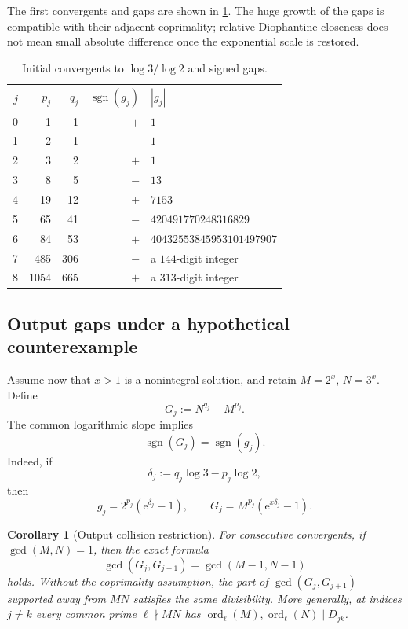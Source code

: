 \documentclass[11pt,oneside]{article}
\newtheorem{corollary}[theorem]{Corollary}
\theoremstyle{definition}
\theoremstyle{remark}
\newcommand{\ord}{\operatorname{ord}}
\newcommand{\sgn}{\operatorname{sgn}}
\newcommand{\abs}[1]{\left|#1\right|}
\newcommand{\e}{\mathrm e}
\begin{document}
The first convergents and gaps are shown in \cref{tab:gaps}.  The huge growth
of the gaps is compatible with their adjacent coprimality; relative
Diophantine closeness does not mean small absolute difference once the
exponential scale is restored.

\begin{table}[ht]
\centering
\caption{Initial convergents to $\log3/\log2$ and signed gaps.}
\label{tab:gaps}
\begin{tabular}{@{}rrrrl@{}}
\toprule
$j$ & $p_j$ & $q_j$ & $\sgn(g_j)$ & $\abs{g_j}$ \\
\midrule
0 & 1 & 1 & $+$ & $1$\\
1 & 2 & 1 & $-$ & $1$\\
2 & 3 & 2 & $+$ & $1$\\
3 & 8 & 5 & $-$ & $13$\\
4 & 19 & 12 & $+$ & $7153$\\
5 & 65 & 41 & $-$ & $420491770248316829$\\
6 & 84 & 53 & $+$ & $40432553845953101497907$\\
7 & 485 & 306 & $-$ & a $144$-digit integer\\
8 & 1054 & 665 & $+$ & a $313$-digit integer\\
\bottomrule
\end{tabular}
\end{table}

\subsection{Output gaps under a hypothetical counterexample}

Assume now that $x>1$ is a nonintegral solution, and retain $M=2^x$,
$N=3^x$.  Define
\begin{equation}
  G_j:=N^{q_j}-M^{p_j}.
  \label{eq:outputgap}
\end{equation}
The common logarithmic slope implies
\begin{equation}
  \sgn(G_j)=\sgn(g_j).
  \label{eq:samesign}
\end{equation}
Indeed, if
\begin{equation}
  \delta_j:=q_j\log3-p_j\log2,
  \label{eq:delta}
\end{equation}
then
\[
  g_j=2^{p_j}(\e^{\delta_j}-1),\qquad
  G_j=M^{p_j}(\e^{x\delta_j}-1).
\]

\begin{corollary}[Output collision restriction]
\label{cor:outputgcd}
For consecutive convergents, if $\gcd(M,N)=1$, then the exact formula
\[
  \gcd(G_j,G_{j+1})=\gcd(M-1,N-1)
\]
holds.
Without the coprimality assumption, the part of
$\gcd(G_j,G_{j+1})$ supported away from $MN$ satisfies the same divisibility.
More generally, at indices $j\ne k$ every common prime $\ell\nmid MN$ has
$\ord_\ell(M),\ord_\ell(N)\mid D_{jk}$.
\end{corollary}
\end{document}
